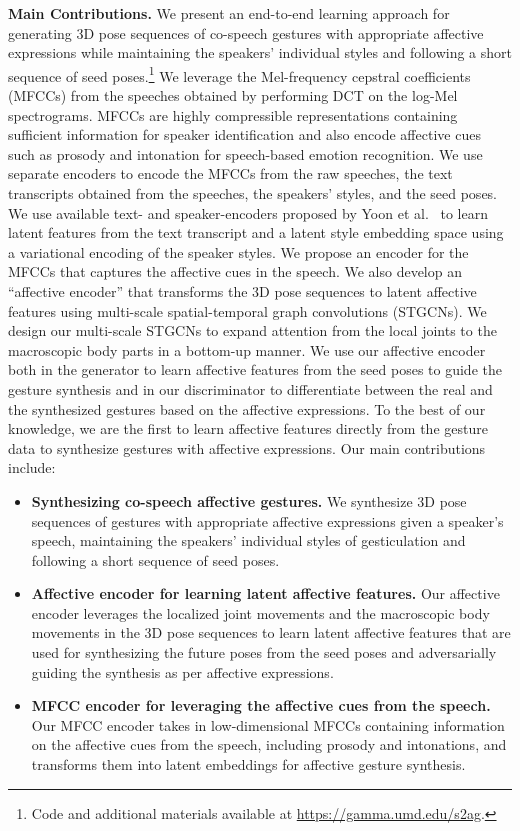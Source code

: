 \documentclass[conference,compsoc]{IEEEtran}
\theoremstyle{definition}
\begin{document}
\noindent\textbf{Main Contributions.} We present an end-to-end learning approach for generating 3D pose sequences of co-speech gestures with appropriate affective expressions while maintaining the speakers' individual styles and following a short sequence of seed poses.\footnote{Code and additional materials available at \url{https://gamma.umd.edu/s2ag}.} 
We leverage the Mel-frequency cepstral coefficients (MFCCs) from the speeches obtained by performing DCT on the log-Mel spectrograms. MFCCs are highly compressible representations containing sufficient information for speaker identification and also encode affective cues such as prosody and intonation for speech-based emotion recognition. We use separate encoders to encode the MFCCs from the raw speeches, the text transcripts obtained from the speeches, the speakers' styles, and the seed poses. We use available text- and speaker-encoders proposed by Yoon et al.~\cite{trimodal} to learn latent features from the text transcript and a latent style embedding space using a variational encoding of the speaker styles. We propose an encoder for the MFCCs that captures the affective cues in the speech. We also develop an ``affective encoder'' that transforms the 3D pose sequences to latent affective features using multi-scale spatial-temporal graph convolutions (STGCNs).
We design our multi-scale STGCNs to expand attention from the local joints to the macroscopic body parts in a bottom-up manner. We use our affective encoder both in the generator to learn affective features from the seed poses to guide the gesture synthesis and in our discriminator to differentiate between the real and the synthesized gestures based on the affective expressions. To the best of our knowledge, we are the first to learn affective features directly from the gesture data to synthesize gestures with affective expressions. Our main contributions include:

\begin{itemize}
    \item \textbf{Synthesizing co-speech affective gestures.} We synthesize 3D pose sequences of gestures with appropriate affective expressions given a speaker's speech, maintaining the speakers' individual styles of gesticulation and following a short sequence of seed poses.

    \item \textbf{Affective encoder for learning latent affective features.} Our affective encoder leverages the localized joint movements and the macroscopic body movements in the 3D pose sequences to learn latent affective features that are used for synthesizing the future poses from the seed poses and adversarially guiding the synthesis as per affective expressions.
    
    \item \textbf{MFCC encoder for leveraging the affective cues from the speech.} Our MFCC encoder takes in low-dimensional MFCCs containing information on the affective cues from the speech, including prosody and intonations, and transforms them into latent embeddings for affective gesture synthesis.
\end{itemize}
\end{document}
